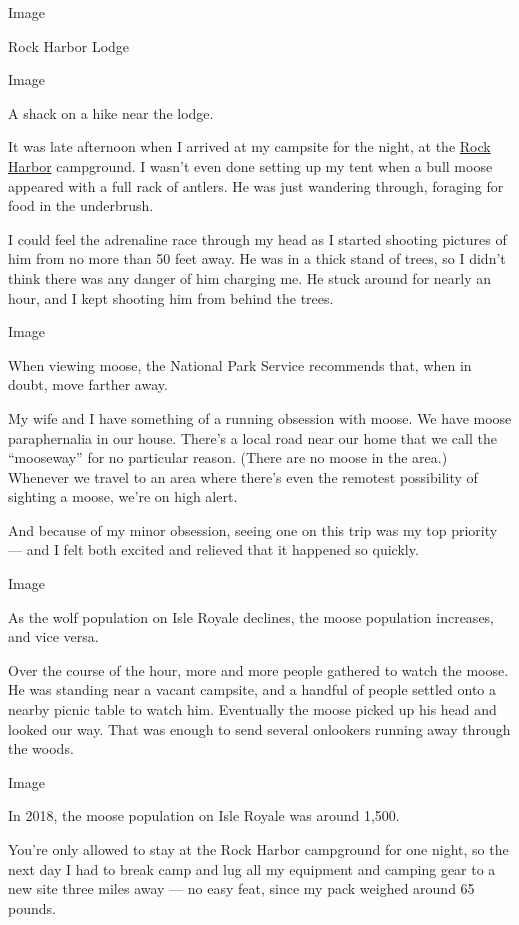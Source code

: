 Image

Rock Harbor Lodge

Image

A shack on a hike near the lodge.

It was late afternoon when I arrived at my campsite for the night, at
the \href{https://www.nps.gov/isro/planyourvisit/rock-harbor.htm}{Rock
Harbor} campground. I wasn't even done setting up my tent when a bull
moose appeared with a full rack of antlers. He was just wandering
through, foraging for food in the underbrush.

I could feel the adrenaline race through my head as I started shooting
pictures of him from no more than 50 feet away. He was in a thick stand
of trees, so I didn't think there was any danger of him charging me. He
stuck around for nearly an hour, and I kept shooting him from behind the
trees.

Image

When viewing moose, the National Park Service recommends that, when in
doubt, move farther away.

My wife and I have something of a running obsession with moose. We have
moose paraphernalia in our house. There's a local road near our home
that we call the ``mooseway'' for no particular reason. (There are no
moose in the area.) Whenever we travel to an area where there's even the
remotest possibility of sighting a moose, we're on high alert.

And because of my minor obsession, seeing one on this trip was my top
priority --- and I felt both excited and relieved that it happened so
quickly.

Image

As the wolf population on Isle Royale declines, the moose population
increases, and vice versa.

Over the course of the hour, more and more people gathered to watch the
moose. He was standing near a vacant campsite, and a handful of people
settled onto a nearby picnic table to watch him. Eventually the moose
picked up his head and looked our way. That was enough to send several
onlookers running away through the woods.

Image

In 2018, the moose population on Isle Royale was around 1,500.

You're only allowed to stay at the Rock Harbor campground for one night,
so the next day I had to break camp and lug all my equipment and camping
gear to a new site three miles away --- no easy feat, since my pack
weighed around 65 pounds.

